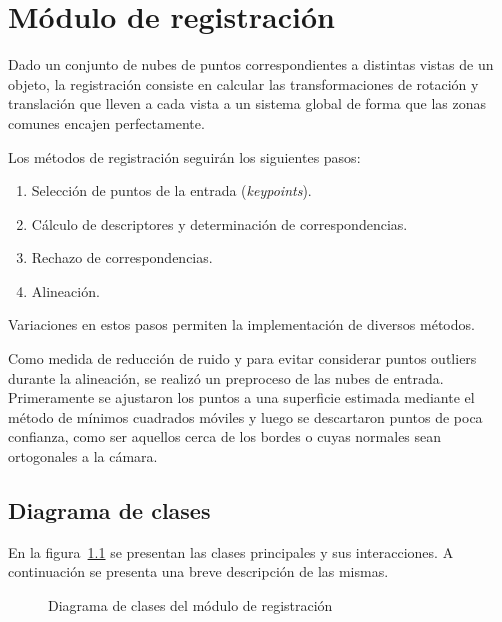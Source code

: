 \chapter{Módulo de registración}
	Dado un conjunto de nubes de puntos correspondientes a distintas vistas de
	un objeto, la registración consiste en calcular las transformaciones de
	rotación y translación que lleven a cada vista a un sistema global de forma
	que las zonas comunes encajen perfectamente.

	Los métodos de registración seguirán los siguientes pasos:
	\begin{enumerate}
		\item Selección de puntos de la entrada (\emph{keypoints}).
		\item Cálculo de descriptores y determinación de correspondencias.
		\item Rechazo de correspondencias.
		\item Alineación.
	\end{enumerate}
	Variaciones en estos pasos permiten la implementación de diversos métodos.

	Como medida de reducción de ruido y para evitar considerar puntos outliers
	durante la alineación, se realizó un preproceso de las nubes de entrada.
	Primeramente se ajustaron los puntos a una superficie estimada mediante el
	método de mínimos cuadrados móviles y luego se descartaron puntos de poca
	confianza, como ser aquellos cerca de los bordes o cuyas normales sean
	ortogonales a la cámara.

	\section{Diagrama de clases}
		En la figura~\ref{fig:align_class} se presentan las clases principales y sus interacciones.
		A continuación se presenta una breve descripción de las mismas.
		\begin{figure}
			\caption{\label{fig:align_class}Diagrama de clases del módulo de registración}
		\end{figure}

